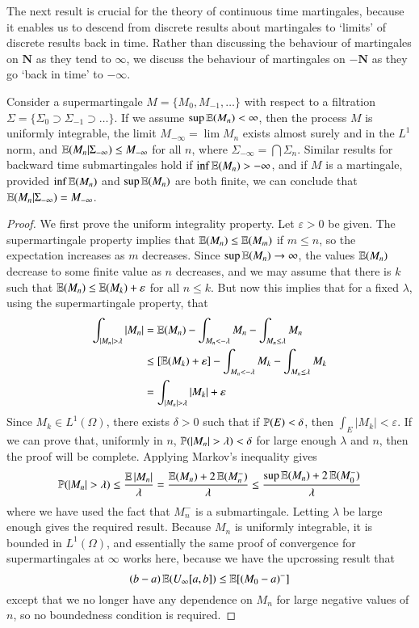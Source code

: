 The next result is crucial for the theory of continuous time martingales, because it enables us to descend from discrete results about martingales to `limits' of discrete results back in time. Rather than discussing the behaviour of martingales on $\mathbf{N}$ as they tend to $\infty$, we discuss the behaviour of martingales on $-\mathbf{N}$ as they go `back in time' to $-\infty$.

\begin{theorem}
    Consider a supermartingale $M = \{ M_0, M_{-1}, \dots \}$ with respect to a filtration $\Sigma = \{ \Sigma_0 \supset \Sigma_{-1} \supset \dots \}$. If we assume $\sup \operatorname{\mathbb{E}}(M_n) < \infty$, then the process $M$ is uniformly integrable, the limit $M_{-\infty} = \lim M_n$ exists almost surely and in the $L^1$ norm, and $\operatorname{\mathbb{E}}(M_n|\Sigma_{-\infty}) \leq M_{-\infty}$ for all $n$, where $\Sigma_{-\infty} = \bigcap \Sigma_n$. Similar results for backward time submartingales hold if $\inf \operatorname{\mathbb{E}}(M_n) > -\infty$, and if $M$ is a martingale, provided $\inf \operatorname{\mathbb{E}}(M_n)$ and $\sup \operatorname{\mathbb{E}}(M_n)$ are both finite, we can conclude that $\operatorname{\mathbb{E}}(M_n|\Sigma_{-\infty}) = M_{-\infty}$.
\end{theorem}
\begin{proof}
    We first prove the uniform integrality property. Let $\varepsilon > 0$ be given. The supermartingale property implies that $\operatorname{\mathbb{E}}(M_n) \leq \operatorname{\mathbb{E}}(M_m)$ if $m \leq n$, so the expectation increases as $m$ decreases. Since $\sup \operatorname{\mathbb{E}}(M_n) \to \infty$, the values $\operatorname{\mathbb{E}}(M_n)$ decrease to some finite value as $n$ decreases, and we may assume that there is $k$ such that $\operatorname{\mathbb{E}}(M_n) \leq \operatorname{\mathbb{E}}(M_k) + \varepsilon$ for all $n \leq k$. But now this implies that for a fixed $\lambda$, using the supermartingale property, that
    \begin{align*}
        \int_{|M_n| > \lambda} |M_n| &= \operatorname{\mathbb{E}}(M_n) - \int_{M_n < -\lambda} M_n - \int_{M_n \leq \lambda} M_n\\
        &\leq [\operatorname{\mathbb{E}}(M_k) + \varepsilon] - \int_{M_n < -\lambda} M_k - \int_{M_n \leq \lambda} M_k\\
        &= \int_{|M_n| > \lambda} |M_k| + \varepsilon
    \end{align*}
    Since $M_k \in L^1(\Omega)$, there exists $\delta > 0$ such that if $\operatorname{\mathbb{P}}(E) < \delta$, then $\int_E |M_k| < \varepsilon$. If we can prove that, uniformly in $n$, $\operatorname{\mathbb{P}}(|M_n| > \lambda) < \delta$ for large enough $\lambda$ and $n$, then the proof will be complete. Applying Markov's inequality gives
    \[ \operatorname{\mathbb{P}}(|M_n| > \lambda) \leq \frac{\operatorname{\mathbb{E}}|M_n|}{\lambda} = \frac{\operatorname{\mathbb{E}}(M_n) + 2\operatorname{\mathbb{E}}(M_n^-)}{\lambda} \leq \frac{\sup \operatorname{\mathbb{E}}(M_n) + 2 \operatorname{\mathbb{E}}(M_0^-)}{\lambda} \]
    where we have used the fact that $M_n^-$ is a submartingale. Letting $\lambda$ be large enough gives the required result. Because $M_n$ is uniformly integrable, it is bounded in $L^1(\Omega)$, and essentially the same proof of convergence for supermartingales at $\infty$ works here, because we have the upcrossing result that
    \[ (b - a)\operatorname{\mathbb{E}}(U_\infty[a,b]) \leq \operatorname{\mathbb{E}}[(M_0 - a)^-] \]
    except that we no longer have any dependence on $M_n$ for large negative values of $n$, so no boundedness condition is required.
\end{proof}

